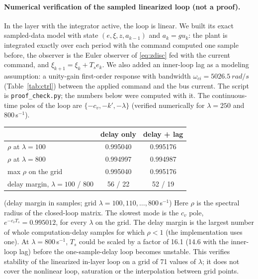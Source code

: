 \paragraph{Numerical verification of the sampled linearized loop (not a proof).} In the layer with the integrator active, the loop is linear. We built its exact sampled-data model with state $(e,\xi,z,a_{k-1})$ and $a_k=gu_k$: the plant is integrated exactly over each period with the command computed one sample before, the observer is the Euler observer of \eqref{eq:zdisc} fed with the current command, and $\xi_{k+1}=\xi_k+T_se_k$. We also added an inner-loop lag as a modeling assumption: a unity-gain first-order response with bandwidth $\omega_{ci}=\SI{5026.5}{rad/s}$ (Table~\ref{tab:ctrl}) between the applied command and the bus current. The script is \texttt{proof\_check.py}; the numbers below were computed with it. The continuous-time poles of the loop are $\{-c_v,-k',-\lambda\}$ (verified numerically for $\lambda=250$ and $800$\,s$^{-1}$).
\begin{center}\footnotesize
\begin{tabular}{@{}lcc@{}}
\toprule
 & delay only & delay + lag\\
\midrule
$\rho$ at $\lambda=100$ & 0.995040 & 0.995176\\
$\rho$ at $\lambda=800$ & 0.994997 & 0.994987\\
max $\rho$ on the grid & 0.995040 & 0.995176\\
delay margin, $\lambda=100$ / $800$ & 56 / 22 & 52 / 19\\
\bottomrule
\end{tabular}
\end{center}
(delay margin in samples; grid $\lambda=100,110,\dots,800$\,s$^{-1}$)
Here $\rho$ is the spectral radius of the closed-loop matrix. The slowest mode is the $c_v$ pole, $e^{-c_vT_s}=0.995012$, for every $\lambda$ on the grid. The delay margin is the largest number of whole computation-delay samples for which $\rho<1$ (the implementation uses one). At $\lambda=800$\,s$^{-1}$, $T_s$ could be scaled by a factor of 16.1 (14.6 with the inner-loop lag) before the one-sample-delay loop becomes unstable. This verifies stability of the linearized in-layer loop on a grid of 71 values of $\lambda$; it does not cover the nonlinear loop, saturation or the interpolation between grid points.

